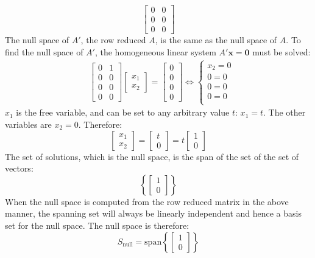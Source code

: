 \documentclass{article}
\begin{document}
\begin{itemize}
\[\begin{bmatrix}
0 & 0 \\
0 & 0 \\ 
0 & 0
\end{bmatrix}\]
The null space of \(A'\), the row reduced \(A\), is the same as the null space of \(A\). To find the null space of \(A'\), the homogeneous linear system \(A'\mathbf{x} = \mathbf{0}\) must be solved:
\begin{align*}
& \begin{bmatrix}
0 & 1 \\
0 & 0 \\
0 & 0 \\ 
0 & 0
\end{bmatrix}\begin{bmatrix} x_1 \\ x_2 \end{bmatrix} = \begin{bmatrix} 0 \\ 0 \\ 0 \\ 0 \end{bmatrix} 
\iff \left\{\begin{array}{c} 
x_2 = 0 \\ 
0 = 0 \\
0 = 0 \\
0 = 0 \\ 
\end{array}\right.
\end{align*}
\(x_1\) is the free variable, and can be set to any arbitrary value \(t\): \(x_1 = t\). The other variables are \(x_2 = 0\). Therefore:
\[\begin{bmatrix} x_1 \\ x_2 \end{bmatrix} = \begin{bmatrix} t \\ 0 \end{bmatrix} = t \begin{bmatrix} 1 \\ 0 \end{bmatrix}\]  
The set of solutions, which is the null space, is the span of the set of the set of vectors:
\[\left\{\begin{bmatrix} 1 \\ 0 \end{bmatrix}\right\}\] 
When the null space is computed from the row reduced matrix in the above manner, the spanning set will always be linearly independent and hence a basis set for the null space. The null space is therefore:
\[S_{\text{null}} = \text{span}\left\{\begin{bmatrix} 1 \\ 0 \end{bmatrix}\right\}\]

\end{itemize}
\end{document}
